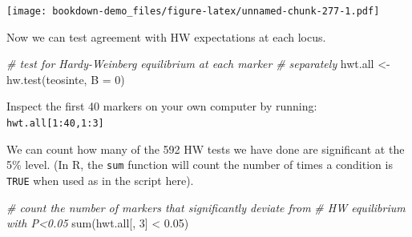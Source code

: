 \documentclass[
]{book}
\newenvironment{Shaded}{\begin{snugshade}}{\end{snugshade}}
\newcommand{\AttributeTok}[1]{\textcolor[rgb]{0.77,0.63,0.00}{#1}}
\newcommand{\CommentTok}[1]{\textcolor[rgb]{0.56,0.35,0.01}{\textit{#1}}}
\newcommand{\DecValTok}[1]{\textcolor[rgb]{0.00,0.00,0.81}{#1}}
\newcommand{\FloatTok}[1]{\textcolor[rgb]{0.00,0.00,0.81}{#1}}
\newcommand{\FunctionTok}[1]{\textcolor[rgb]{0.00,0.00,0.00}{#1}}
\newcommand{\NormalTok}[1]{#1}
\newcommand{\OtherTok}[1]{\textcolor[rgb]{0.56,0.35,0.01}{#1}}
\newcommand{\SpecialCharTok}[1]{\textcolor[rgb]{0.00,0.00,0.00}{#1}}
\newcommand{\StringTok}[1]{\textcolor[rgb]{0.31,0.60,0.02}{#1}}
\begin{document}
\begin{Shaded}
\end{Shaded}

\texttt{[image: bookdown-demo\_files/figure-latex/unnamed-chunk-277-1.pdf]}

\begin{Shaded}
\end{Shaded}

Now we can test agreement with HW expectations at each locus.

\begin{Shaded}
\begin{Highlighting}[]
\CommentTok{\# test for Hardy{-}Weinberg equilibrium at each marker}
\CommentTok{\# separately}
\NormalTok{hwt.all }\OtherTok{\textless{}{-}} \FunctionTok{hw.test}\NormalTok{(teosinte, }\AttributeTok{B =} \DecValTok{0}\NormalTok{)}
\end{Highlighting}
\end{Shaded}

Inspect the first 40 markers on your own computer by running: \texttt{hwt.all{[}1:40,1:3{]}}

We can count how many of the 592 HW tests we have done are significant at the 5\% level. (In R, the \texttt{sum} function will count the number of times a condition is \texttt{TRUE} when used as in the script here).

\begin{Shaded}
\begin{Highlighting}[]
\CommentTok{\# count the number of markers that significantly deviate from}
\CommentTok{\# HW equilibrium with P\textless{}0.05}
\FunctionTok{sum}\NormalTok{(hwt.all[, }\DecValTok{3}\NormalTok{] }\SpecialCharTok{\textless{}} \FloatTok{0.05}\NormalTok{)}
\end{Highlighting}
\end{Shaded}
\end{document}
